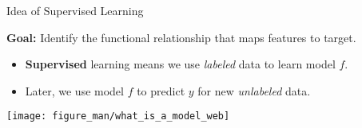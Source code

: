 \documentclass[11pt,compress,t,notes=noshow, xcolor=table]{beamer}
\begin{document}
\begin{vbframe}{Idea of Supervised Learning}
  
  
  \textbf{Goal:} Identify the functional relationship that maps features to target.
  
  \lz
  
  \begin{itemize}
    
    \item \textbf{Supervised} learning means we use \emph{labeled} data to learn model $f$. %
    
    
    
    \item Later, we use model $f$ to predict $y$ for 
    new \emph{unlabeled} data. %
    
  \end{itemize}
  
  \begin{center}
    \texttt{[image: figure\_man/what\_is\_a\_model\_web]} 
  \end{center}
\end{vbframe}

\end{document}
